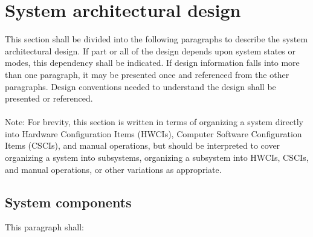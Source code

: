 \section{System architectural design}

This section shall be divided into the following paragraphs to describe
the system architectural design. If part or all of the design depends
upon system states or modes, this dependency shall be indicated. If
design information falls into more than one paragraph, it may be
presented once and referenced from the other paragraphs. Design
conventions needed to understand the design shall be presented or
referenced. \\\\ Note: For brevity, this section is written in terms of
organizing a system directly into Hardware Configuration Items (HWCIs),
Computer Software Configuration Items (CSCIs), and manual operations,
but should be interpreted to cover organizing a system into subsystems,
organizing a subsystem into HWCIs, CSCIs, and manual operations, or
other variations as appropriate.

\subsection{System components}

This paragraph shall:

